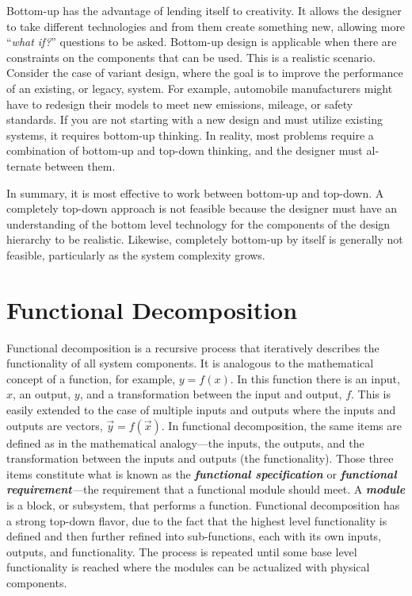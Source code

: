 Bottom-up has the advantage of lending itself to creativity. It allows
the designer to take different technologies and from them create
something new, allowing more ``\emph{what if?}'' questions to be asked.
Bottom-up design is applicable when there are constraints on the
components that can be used. This is a realistic scenario. Consider the
case of variant design, where the goal is to improve the performance of
an existing, or legacy, system. For example, automobile manufacturers
might have to redesign their models to meet new emissions, mileage, or
safety standards. If you are not starting with a new design and must
utilize existing systems, it requires bottom-up thinking. In reality,
most problems require a combination of bottom-up and top-down thinking,
and the designer must al­ternate between them.

In summary, it is most effective to work between bottom-up and top-down.
A completely top-down approach is not feasible because the designer must
have an understanding of the bottom level technology for the components
of the design hierarchy to be realistic. Likewise, com­pletely bottom-up
by itself is generally not feasible, particularly as the system
complexity grows.

\section{Functional Decomposition}
\label{section:functional-decomposition}

Functional decomposition is a recursive process that iteratively
describes the functionality of all system components. It is analogous to
the mathematical concept of a function, for example, $y=f(x)$. In
this function there is an input, $x$, an output, $y$, and a
transformation between the input and output, $f$. This is easily
extended to the case of multiple inputs and outputs where the inputs and
outputs are vectors, $\vec{y}=f(\vec{x})$. In
functional decomposition, the same items are defined as in the
mathematical analogy---the inputs, the outputs, and the transformation
between the inputs and outputs (the functionality). Those three items
constitute what is known as the \emph{\textbf{functional specification}}
or \emph{\textbf{functional requirement}­---}the requirement that a
functional module should meet. A \emph{\textbf{module}} is a block, or
subsystem, that performs a function. Functional decomposition has a
strong top-down flavor, due to the fact that the highest level
functionality is defined and then further refined into sub-functions,
each with its own inputs, outputs, and functionality. The process is
repeated until some base level functionality is reached where the
modules can be actualized with physical components.

